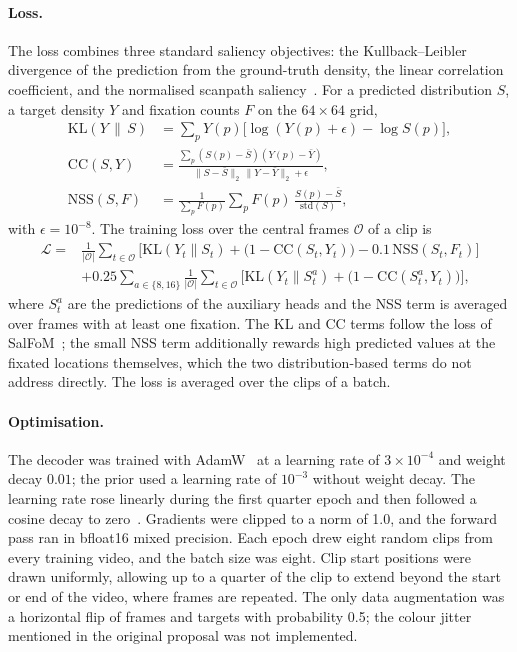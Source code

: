 \paragraph{Loss.} The loss combines three standard saliency objectives:
the Kullback--Leibler divergence of the prediction from the ground-truth
density, the linear correlation coefficient, and the normalised scanpath
saliency~\cite{bylinskii2019metrics}. For a predicted distribution $S$, a
target density $Y$ and fixation counts $F$ on the $64\times64$ grid,
\begin{align}
  \mathrm{KL}(Y\,\|\,S) &= \sum_p Y(p)\big[\log(Y(p)+\epsilon) - \log S(p)\big], \label{eq:kl}\\
  \mathrm{CC}(S,Y) &= \frac{\sum_p (S(p)-\bar S)(Y(p)-\bar Y)}
     {\big\|S-\bar S\big\|_2\,\big\|Y-\bar Y\big\|_2+\epsilon}, \label{eq:cc-loss}\\
  \mathrm{NSS}(S,F) &= \frac{1}{\sum_p F(p)}\sum_p F(p)\,\frac{S(p)-\bar S}{\mathrm{std}(S)}, \label{eq:nss-loss}
\end{align}
with $\epsilon=10^{-8}$. The training loss over the central frames
$\mathcal{O}$ of a clip is
\begin{equation}
\begin{split}
  \mathcal{L} = {}& \frac{1}{|\mathcal{O}|}\sum_{t\in\mathcal{O}}
  \Big[\mathrm{KL}(Y_t\|S_t) + \big(1-\mathrm{CC}(S_t,Y_t)\big) - 0.1\,\mathrm{NSS}(S_t,F_t)\Big]\\
  &+ 0.25\sum_{a\in\{8,16\}}\frac{1}{|\mathcal{O}|}\sum_{t\in\mathcal{O}}
  \Big[\mathrm{KL}(Y_t\|S^{a}_t) + \big(1-\mathrm{CC}(S^{a}_t,Y_t)\big)\Big],
\end{split}
\label{eq:loss}
\end{equation}
where $S^{a}_t$ are the predictions of the auxiliary heads and the \acrshort{NSS} term is
averaged over frames with at least one fixation. The \acrshort{KL} and \acrshort{CC} terms follow
the loss of SalFoM~\cite{moradi2024salfom}; the small \acrshort{NSS} term additionally
rewards high predicted values at the fixated locations themselves, which the
two distribution-based terms do not address directly. The loss is averaged
over the clips of a batch.

\paragraph{Optimisation.} The decoder was trained with
AdamW~\cite{loshchilov2019decoupled} at a learning rate of $3\times10^{-4}$
and weight decay $0.01$; the prior used a learning rate of $10^{-3}$ without
weight decay. The learning rate rose linearly during the first quarter epoch
and then followed a cosine decay to zero~\cite{loshchilov2017sgdr}. Gradients
were clipped to a norm of 1.0, and the forward pass ran in bfloat16 mixed
precision. Each epoch drew eight random clips from every training video, and
the batch size was eight. Clip start positions were drawn uniformly, allowing
up to a quarter of the clip to extend beyond the start or end of the video,
where frames are repeated. The only data augmentation was a horizontal flip
of frames and targets with probability 0.5; the colour jitter mentioned in the
original proposal was not implemented.

